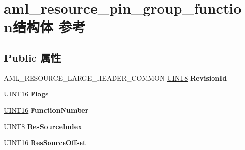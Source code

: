 \hypertarget{structaml__resource__pin__group__function}{}\section{aml\+\_\+resource\+\_\+pin\+\_\+group\+\_\+function结构体 参考}
\label{structaml__resource__pin__group__function}
\subsection*{Public 属性}
\begin{DoxyCompactItemize}
\item 
\mbox{\label{structaml__resource__pin__group__function_a11b4b4f7104b79470b490a4637563977}} 
A\+M\+L\+\_\+\+R\+E\+S\+O\+U\+R\+C\+E\+\_\+\+L\+A\+R\+G\+E\+\_\+\+H\+E\+A\+D\+E\+R\+\_\+\+C\+O\+M\+M\+ON \hyperlink{_processor_bind_8h_ab27e9918b538ce9d8ca692479b375b6a}{U\+I\+N\+T8} {\bfseries Revision\+Id}
\item 
\mbox{\label{structaml__resource__pin__group__function_ae51b30e4679d2cb9aa68712064168260}} 
\hyperlink{_processor_bind_8h_a09f1a1fb2293e33483cc8d44aefb1eb1}{U\+I\+N\+T16} {\bfseries Flags}
\item 
\mbox{\label{structaml__resource__pin__group__function_a3abe34fd26e3957d1c4a5aca25127d04}} 
\hyperlink{_processor_bind_8h_a09f1a1fb2293e33483cc8d44aefb1eb1}{U\+I\+N\+T16} {\bfseries Function\+Number}
\item 
\mbox{\label{structaml__resource__pin__group__function_a75f7af86aef4edbcd10b45a35cdcdc40}} 
\hyperlink{_processor_bind_8h_ab27e9918b538ce9d8ca692479b375b6a}{U\+I\+N\+T8} {\bfseries Res\+Source\+Index}
\item 
\mbox{\label{structaml__resource__pin__group__function_ab52cca7d406205b2209ceec59800bb76}} 
\hyperlink{_processor_bind_8h_a09f1a1fb2293e33483cc8d44aefb1eb1}{U\+I\+N\+T16} {\bfseries Res\+Source\+Offset}
\item 
\mbox{\label{structaml__resource__pin__group__function_afcb26c7b30170992229e5a4fd5cbe6db}} 

\end{DoxyCompactItemize}
